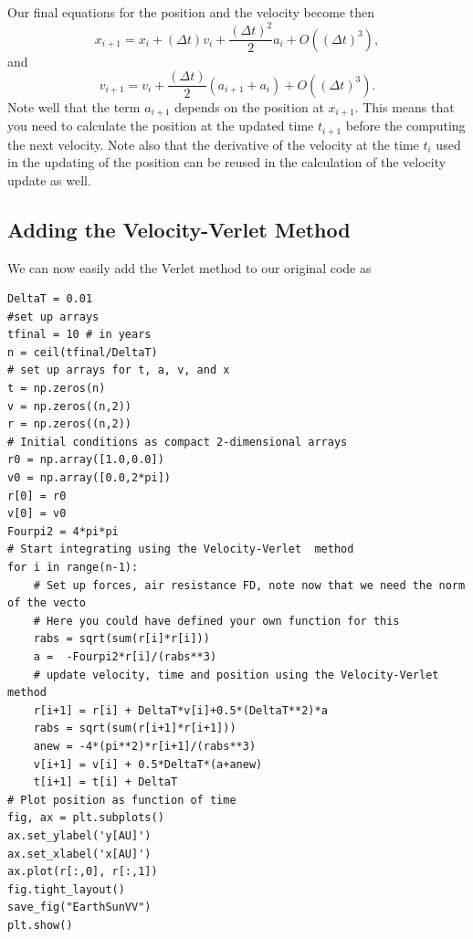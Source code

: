 \documentclass[%
oneside,                 %
final,                   %
10pt]{article}
\begin{document}
Our final equations for the position and the velocity become then 
\[
x_{i+1} = x_i+(\Delta t)v_i+\frac{(\Delta t)^2}{2}a_{i}+O((\Delta t)^3),
\]
and
\[
v_{i+1} = v_i+\frac{(\Delta t)}{2}\left(a_{i+1}+a_{i}\right)+O((\Delta t)^3). 
\]
Note well that the term $a_{i+1}$ depends on the position at $x_{i+1}$. This means that you need to calculate 
the position at the updated time $t_{i+1}$ before the computing the next velocity.  Note also that the derivative of the velocity at the time
$t_i$ used in the updating of the position can be reused in the calculation of the velocity update as well. 

\subsection*{Adding the Velocity-Verlet Method}

We can now easily add the Verlet method to our original code as



































\begin{verbatim}
DeltaT = 0.01
#set up arrays 
tfinal = 10 # in years
n = ceil(tfinal/DeltaT)
# set up arrays for t, a, v, and x
t = np.zeros(n)
v = np.zeros((n,2))
r = np.zeros((n,2))
# Initial conditions as compact 2-dimensional arrays
r0 = np.array([1.0,0.0])
v0 = np.array([0.0,2*pi])
r[0] = r0
v[0] = v0
Fourpi2 = 4*pi*pi
# Start integrating using the Velocity-Verlet  method
for i in range(n-1):
    # Set up forces, air resistance FD, note now that we need the norm of the vecto
    # Here you could have defined your own function for this
    rabs = sqrt(sum(r[i]*r[i]))
    a =  -Fourpi2*r[i]/(rabs**3)
    # update velocity, time and position using the Velocity-Verlet method
    r[i+1] = r[i] + DeltaT*v[i]+0.5*(DeltaT**2)*a
    rabs = sqrt(sum(r[i+1]*r[i+1]))
    anew = -4*(pi**2)*r[i+1]/(rabs**3)
    v[i+1] = v[i] + 0.5*DeltaT*(a+anew)
    t[i+1] = t[i] + DeltaT
# Plot position as function of time    
fig, ax = plt.subplots()
ax.set_ylabel('y[AU]')
ax.set_xlabel('x[AU]')
ax.plot(r[:,0], r[:,1])
fig.tight_layout()
save_fig("EarthSunVV")
plt.show()

\end{verbatim}
\end{document}
